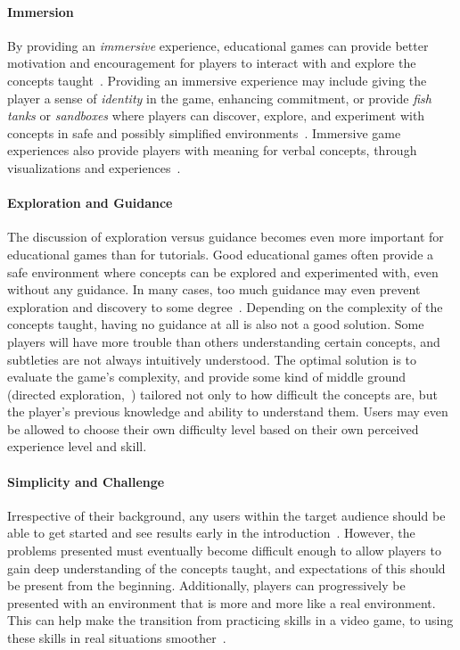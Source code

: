 \paragraph{Immersion} By providing an \emph{immersive} experience, educational games can provide better motivation and encouragement for players to interact with and explore the concepts taught~\cite{esper:codespells}. Providing an immersive experience may include giving the player a sense of \emph{identity} in the game, enhancing commitment, or provide \emph{fish tanks} or \emph{sandboxes} where players can discover, explore, and experiment with concepts in safe and possibly simplified environments~\cite{gee:learning_machines}. Immersive game experiences also provide players with meaning for verbal concepts, through visualizations and experiences~\cite{gee:learning_machines}.

\paragraph{Exploration and Guidance} The discussion of exploration versus guidance becomes even more important for educational games than for tutorials. Good educational games often provide a safe environment where concepts can be explored and experimented with, even without any guidance. In many cases, too much guidance may even prevent exploration and discovery to some degree~\cite{bonawitz:double_edged_pedagogy}. Depending on the complexity of the concepts taught, having no guidance at all is also not a good solution. Some players will have more trouble than others understanding certain concepts, and subtleties are not always intuitively understood. The optimal solution is to evaluate the game's complexity, and provide some kind of middle ground (directed exploration,~\cite{esper:design_quests_java_concepts}) tailored not only to how difficult the concepts are, but the player's previous knowledge and ability to understand them. Users may even be allowed to choose their own difficulty level based on their own perceived experience level and skill.

\paragraph{Simplicity and Challenge} Irrespective of their background, any users within the target audience should be able to get started and see results early in the introduction~\cite{esper:design_quests_java_concepts}. However, the problems presented must eventually become difficult enough to allow players to gain deep understanding of the concepts taught, and expectations of this should be present from the beginning. Additionally, players can progressively be presented with an environment that is more and more like a real environment. This can help make the transition from practicing skills in a video game, to using these skills in real situations smoother~\cite{untch:karel_conventional_language}.
